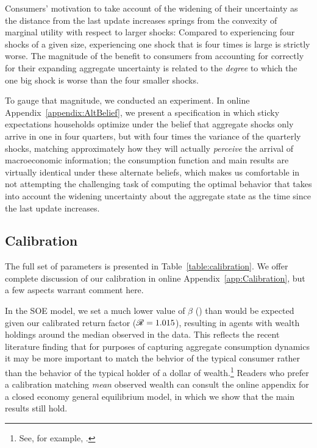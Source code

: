 Consumers' motivation to take account of the widening of their uncertainty as the distance from the last update increases springs from the convexity of marginal utility with respect to larger shocks: Compared to experiencing four shocks of a given size, experiencing one shock that is four times is large is strictly worse.  The magnitude of the benefit to consumers from accounting for correctly for their expanding aggregate uncertainty is related to the \textit{degree} to which the one big shock is worse than the four smaller shocks.

To gauge that magnitude, we conducted an experiment.  In online Appendix~\ref{appendix:AltBelief}, we present a specification in which sticky expectations households optimize under the belief that aggregate shocks only arrive in one in four quarters, but with four times the variance of the quarterly shocks, matching approximately how they will actually \textit{perceive} the arrival of macroeconomic information; the consumption function and main results are virtually identical under these alternate beliefs, which makes us comfortable in not attempting the challenging task of computing the optimal behavior that takes into account the widening uncertainty about the aggregate state as the time since the last update increases.

\subsection{Calibration}\label{sec:calibration}

The full set of parameters is presented in Table~\ref{table:calibration}.  We offer complete discussion of our calibration in online Appendix~\ref{app:Calibration}, but a few aspects warrant comment here.

In the SOE model, we set a much lower value of $\beta$ ($  $) than would be expected given our calibrated return factor (${\mathscr{R}} = 1.015$), resulting in agents with wealth holdings around the median observed in the data.  This reflects the recent literature finding that for purposes of capturing aggregate consumption dynamics it may be more important to match the behvior of the typical consumer rather than the behavior of the typical holder of a dollar of wealth.\footnote{See, for example, \cite{opLiquidH2M}.}  Readers who prefer a calibration matching \textit{mean} observed wealth can consult the online appendix for a closed economy general equilibrium model, in which we show that the main results still hold.

